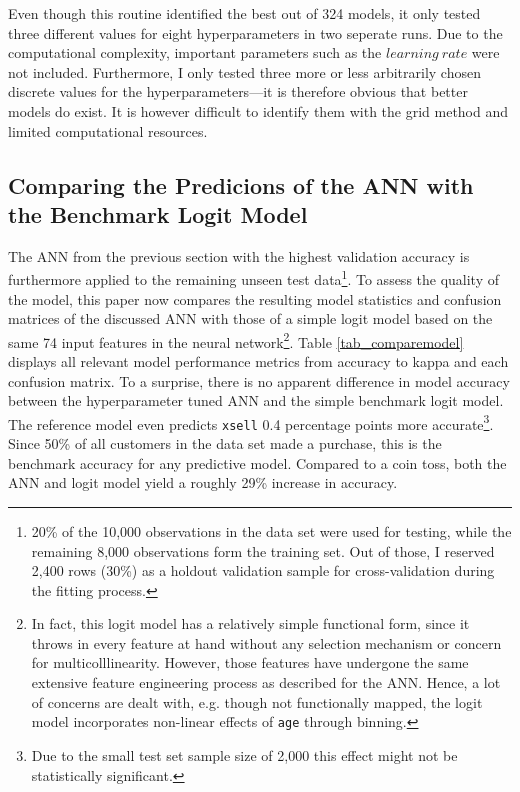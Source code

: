 \documentclass[12pt,a4paper]{article}
\let\code=\texttt
\begin{document}
Even though this routine identified the best out of 324 models, it only tested three different values for eight hyperparameters in two seperate runs.
Due to the computational complexity, important parameters such as the $learning\ rate$ were not included.
Furthermore, I only tested three more or less arbitrarily chosen discrete values for the hyperparameters---it is therefore obvious that
better models do exist. It is however difficult to identify them with the grid method and limited computational resources.

\subsection{Comparing the Predicions of the ANN with the Benchmark Logit Model}

The ANN from the previous section with the highest validation accuracy is furthermore applied to the remaining unseen test data\footnote{20\% 
of the 10,000 observations in the data set were used for testing, while the remaining 8,000 observations form the training set. Out of those, I reserved
2,400 rows (30\%) as a holdout validation sample for cross-validation during the fitting process.}.
To assess the quality of the model, this paper now compares the resulting model statistics and confusion matrices of the discussed ANN with those of a 
simple logit model based on the same 74 input features in the neural network\footnote{In fact, this logit model has a relatively simple functional form, 
since it throws in every feature at hand without any selection mechanism or concern for multicolllinearity.
However, those features have undergone the same extensive feature engineering process as described for the ANN.
Hence, a lot of concerns are dealt with, e.g. though not functionally mapped, the logit model incorporates non-linear effects of \code{age} through binning.}.
Table \ref{tab_comparemodel} displays all relevant model performance metrics from accuracy to kappa and each confusion matrix.
To a surprise, there is no apparent difference in model accuracy between the hyperparameter tuned ANN and the simple benchmark logit model.
The reference model even predicts \code{xsell} 0.4 percentage points more accurate\footnote{Due to the small test set sample size of 2,000 this 
effect might not be statistically significant.}.
Since 50\% of all customers in the data set made a purchase, this is the benchmark accuracy for any predictive model.
Compared to a coin toss, both the ANN and logit model yield a roughly 29\% increase in accuracy.
\end{document}
